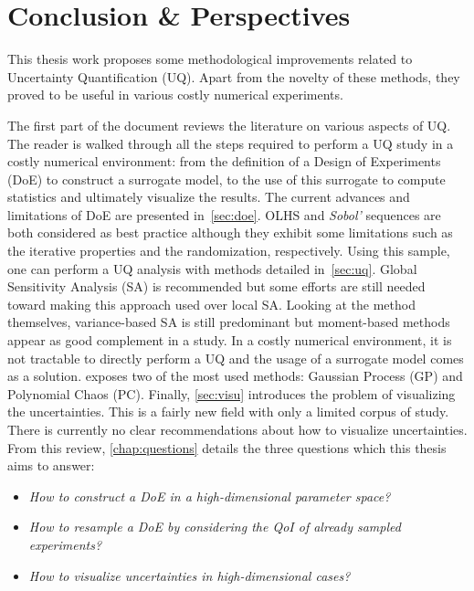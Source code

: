 \chapter*{Conclusion \& Perspectives}


This thesis work proposes some methodological improvements related to Uncertainty Quantification (UQ). Apart from the novelty of these methods, they proved to be useful in various costly numerical experiments.

The first part of the document reviews the literature on various aspects of UQ. The reader is walked through all the steps required to perform a UQ study in a costly numerical environment: from the definition of a Design of Experiments (DoE) to construct a surrogate model, to the use of this surrogate to compute statistics and ultimately visualize the results. The current advances and limitations of DoE are presented in~\cref{sec:doe}. OLHS and \emph{Sobol'} sequences are both considered as best practice although they exhibit some limitations such as the iterative properties and the randomization, respectively. Using this sample, one can perform a UQ analysis with methods detailed in~\cref{sec:uq}. Global Sensitivity Analysis (SA) is recommended but some efforts are still needed toward making this approach used over local SA. Looking at the method themselves, variance-based SA is still predominant but moment-based methods appear as good complement in a study. In a costly numerical environment, it is not tractable to directly perform a UQ and the usage of a surrogate model comes as a solution.  exposes two of the most used methods: Gaussian Process (GP) and Polynomial Chaos (PC). Finally, \cref{sec:visu} introduces the problem of visualizing the uncertainties. This is a fairly new field with only a limited corpus of study. There is currently no clear recommendations about how to visualize uncertainties. From this review, \cref{chap:questions} details the three questions which this thesis aims to answer:
\begin{itemize}
\item \emph{How to construct a DoE in a high-dimensional parameter space?}
\item \emph{How to resample a DoE by considering the QoI of already sampled experiments?}
\item \emph{How to visualize uncertainties in high-dimensional cases?}
\end{itemize}

